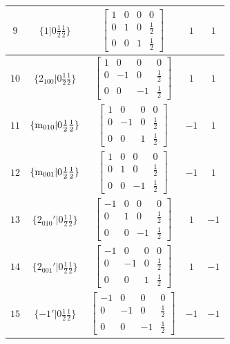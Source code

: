 \documentclass[fleqn,8pt]{jsarticle}
\begin{document}
\begin{longtable}{ccccc}
$ 9 $ & $ \{1|0 \frac{1}{2} \frac{1}{2}\} $ & $ \begin{bmatrix} 1 & 0 & 0 & 0 \\ 0 & 1 & 0 & \frac{1}{2} \\ 0 & 0 & 1 & \frac{1}{2} \end{bmatrix} $ & $ 1 $ & $ 1 $ \\ \hline
$ 10 $ & $ \{2{}_{100}|0 \frac{1}{2} \frac{1}{2}\} $ & $ \begin{bmatrix} 1 & 0 & 0 & 0 \\ 0 & -1 & 0 & \frac{1}{2} \\ 0 & 0 & -1 & \frac{1}{2} \end{bmatrix} $ & $ 1 $ & $ 1 $ \\ \hline
$ 11 $ & $ \{{\rm m}_{010}|0 \frac{1}{2} \frac{1}{2}\} $ & $ \begin{bmatrix} 1 & 0 & 0 & 0 \\ 0 & -1 & 0 & \frac{1}{2} \\ 0 & 0 & 1 & \frac{1}{2} \end{bmatrix} $ & $ -1 $ & $ 1 $ \\ \hline
$ 12 $ & $ \{{\rm m}_{001}|0 \frac{1}{2} \frac{1}{2}\} $ & $ \begin{bmatrix} 1 & 0 & 0 & 0 \\ 0 & 1 & 0 & \frac{1}{2} \\ 0 & 0 & -1 & \frac{1}{2} \end{bmatrix} $ & $ -1 $ & $ 1 $ \\ \hline
$ 13 $ & $ \{2{}_{010}{}'|0 \frac{1}{2} \frac{1}{2}\} $ & $ \begin{bmatrix} -1 & 0 & 0 & 0 \\ 0 & 1 & 0 & \frac{1}{2} \\ 0 & 0 & -1 & \frac{1}{2} \end{bmatrix} $ & $ 1 $ & $ -1 $ \\ \hline
$ 14 $ & $ \{2{}_{001}{}'|0 \frac{1}{2} \frac{1}{2}\} $ & $ \begin{bmatrix} -1 & 0 & 0 & 0 \\ 0 & -1 & 0 & \frac{1}{2} \\ 0 & 0 & 1 & \frac{1}{2} \end{bmatrix} $ & $ 1 $ & $ -1 $ \\ \hline
$ 15 $ & $ \{-1{}'|0 \frac{1}{2} \frac{1}{2}\} $ & $ \begin{bmatrix} -1 & 0 & 0 & 0 \\ 0 & -1 & 0 & \frac{1}{2} \\ 0 & 0 & -1 & \frac{1}{2} \end{bmatrix} $ & $ -1 $ & $ -1 $ \\ \hline

\end{longtable}
\end{document}
